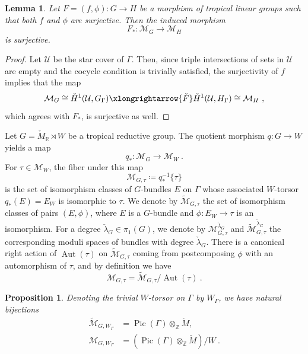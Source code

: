 \documentclass[10pt, a4paper]{amsart}
\newtheorem{lemma}[theorem]{Lemma}
\newtheorem{proposition}[theorem]{Proposition}
\theoremstyle{definition}
\theoremstyle{myitemstyle}
\newcommand{\R}{\mathbb{R}}
\newcommand{\Z}{\mathbb{Z}}
\newcommand{\Mcheck}{{\check{M}}}
\newcommand{\lambdacheck}{\check{\lambda}}
\newcommand{\mc}[1]{{\mathcal{#1}}}
\newcommand{\wmc}[1]{{\widetilde{\mathcal{#1}}}}
\DeclareMathOperator{\Pic}{Pic}
\DeclareMathOperator{\Aut}{Aut}
\newcommand{\Ga}{\Gamma}
\begin{document}
\begin{lemma}
\label{lem:surjective morphism of groups yields surjective morphism of moduli}
Let $F=(f,\phi)\colon G\to H$ be a morphism of tropical linear groups such that both $f$ and $\phi$ are surjective. Then the induced morphism
\[
    F_*\colon \mc M_G\longrightarrow \mc M_H
\]
is surjective. 
\end{lemma}

\begin{proof}
Let $\mc U$ be the star cover of $\Gamma$. Then, since triple intersections of sets in $\mc U$ are empty and the cocycle condition is trivially satisfied, the surjectivity of $f$ implies that the map
\[
    \mc M_G \cong \check H^1 (\mc U,G_\Ga)\xlongrightarrow{\check F} \check H^1(\mc U,H_\Ga)\cong \mc M_H \ ,
\]
which agrees with $F_*$, is surjective as well. 
\end{proof}



Let $G= \Mcheck_\R \rtimes W$ be a tropical reductive group. The quotient morphism $q\colon G\to W$ yields a map
\[
     q_*\colon\mc M_G\longrightarrow \mc M_W \ .
\]
For $\tau\in \mc M_W$, the fiber under this map 
\[
     \mc M_{G,\tau}\coloneqq q_*^{-1}\{\tau\}
\]
is the set of isomorphism classes of $G$-bundles $E$ on $\Ga$ whose associated $W$-torsor $q_*(E) = E_W$ is isomorphic to $\tau$. We denote by $\wmc M_{G,\tau}$ the set of isomorphism classes of pairs $(E,\phi)$, where $E$ is a $G$-bundle and $\phi\colon E_W\to \tau$ is an isomorphism. For a degree $\lambdacheck_G\in \pi_1(G)$, we denote by $\mc M^{\lambdacheck_G}_{G,\tau}$ and $\wmc M^{\lambdacheck_G}_{G,\tau}$ the corresponding moduli spaces of bundles with degree $\lambdacheck_G$. There is a canonical right action of $\Aut(\tau)$ on $\widetilde{\mc M}_{G,\tau}$ coming from postcomposing $\phi$ with an automorphism of $\tau$, and by definition we have 
\[
    \mc M_{G,\tau}=\widetilde{\mc M}_{G,\tau}/\Aut(\tau) \ .
\]

\begin{proposition}
\label{prop:fiber over trivial W-torsor}
Denoting the trivial $W$-torsor on $\Gamma$ by $W_\Gamma$, we have natural bijections 
\begin{align*}
    \widetilde{\mc M}_{G,W_\Gamma}
        &= \Pic(\Gamma)\otimes_\Z \Mcheck, \\[3pt]
    \mc M_{G,W_\Gamma}
        &= (\Pic(\Gamma)\otimes_\Z \Mcheck)/W \ .
\end{align*}


\end{proposition}
\end{document}
